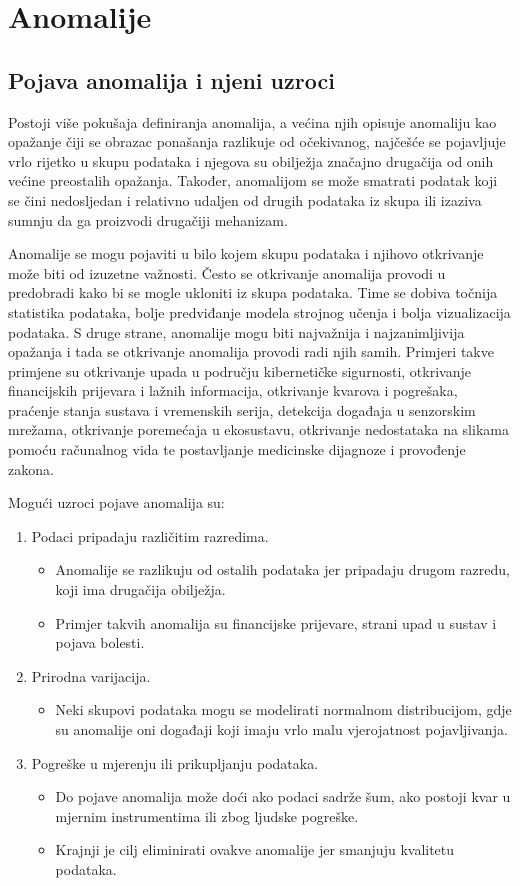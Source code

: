 \documentclass[utf8, diplomski, numeric]{fer}
\begin{document}
\chapter{Anomalije}
\section{Pojava anomalija i njeni uzroci}
Postoji više pokušaja definiranja anomalija, a većina njih opisuje anomaliju kao opažanje čiji se obrazac ponašanja razlikuje od očekivanog, najčešće se pojavljuje vrlo rijetko u skupu podataka i njegova su obilježja značajno drugačija od onih većine preostalih opažanja. Također, anomalijom se može smatrati podatak koji se čini nedosljedan i relativno udaljen od drugih podataka iz skupa ili izaziva sumnju da ga proizvodi drugačiji mehanizam.

Anomalije se mogu pojaviti u bilo kojem skupu podataka i njihovo otkrivanje može biti od izuzetne važnosti. Često se otkrivanje anomalija provodi u predobradi kako bi se mogle ukloniti iz skupa podataka. Time se dobiva točnija statistika podataka, bolje predviđanje modela strojnog učenja i bolja vizualizacija podataka. S druge strane, anomalije mogu biti najvažnija i najzanimljivija opažanja i tada se otkrivanje anomalija provodi radi njih samih. Primjeri takve primjene su otkrivanje upada u području kibernetičke sigurnosti, otkrivanje financijskih prijevara i lažnih informacija, otkrivanje kvarova i pogrešaka, praćenje stanja sustava i vremenskih serija, detekcija događaja u senzorskim mrežama, otkrivanje poremećaja u ekosustavu, otkrivanje nedostataka na slikama pomoću računalnog vida te postavljanje medicinske dijagnoze i provođenje zakona.

Mogući uzroci pojave anomalija su:
\begin{enumerate}
\item Podaci pripadaju različitim razredima.
\begin{itemize}
\item Anomalije se razlikuju od ostalih podataka jer pripadaju drugom razredu, koji ima drugačija obilježja.
\item Primjer takvih anomalija su financijske prijevare, strani upad u sustav i pojava bolesti.
\end{itemize}
\item Prirodna varijacija.
\begin{itemize}
\item Neki skupovi podataka mogu se modelirati normalnom distribucijom, gdje su anomalije oni događaji koji imaju vrlo malu vjerojatnost pojavljivanja.
\end{itemize}
\item Pogreške u mjerenju ili prikupljanju podataka.
\begin{itemize}
\item Do pojave anomalija može doći ako podaci sadrže šum, ako postoji kvar u mjernim instrumentima ili zbog ljudske pogreške.
\item Krajnji je cilj eliminirati ovakve anomalije jer smanjuju kvalitetu podataka.
\end{itemize}
\end{enumerate}
\end{document}
